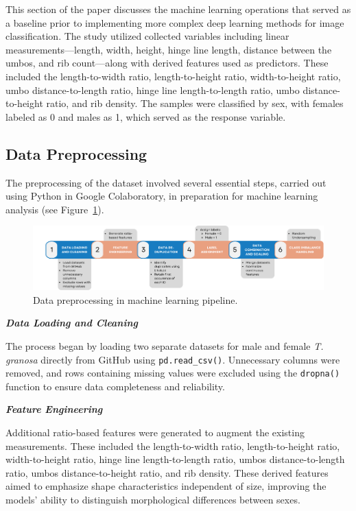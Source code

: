 This section of the paper discusses the machine learning operations that served as a baseline prior to implementing more complex deep learning methods for image classification. The study utilized collected variables including linear measurements—length, width, height, hinge line length, distance between the umbos, and rib count—along with derived features used as predictors. These included the length-to-width ratio, length-to-height ratio, width-to-height ratio, umbo distance-to-length ratio, hinge line length-to-length ratio, umbo distance-to-height ratio, and rib density. The samples were classified by sex, with females labeled as 0 and males as 1, which served as the response variable.

\subsection{Data Preprocessing}
\label{sec:pre-processing}

The preprocessing of the dataset involved several essential steps, carried out using Python in Google Colaboratory, in preparation for machine learning analysis (see Figure~\ref{fig:pipeline}).

\begin{figure}[!htbp]
	\centering
	\includegraphics[width=1\textwidth]{figures/pipeline.png}
	\caption{Data preprocessing in machine learning pipeline.}
	\label{fig:pipeline}
\end{figure}

\textbf{\textit{Data Loading and Cleaning}}

The process began by loading two separate datasets for male and female \textit{T. granosa} directly from GitHub using \texttt{pd.read\_csv()}. Unnecessary columns were removed, and rows containing missing values were excluded using the \texttt{dropna()} function to ensure data completeness and reliability.

\textbf{\textit{Feature Engineering}}

Additional ratio-based features were generated to augment the existing measurements. These included the length-to-width ratio, length-to-height ratio, width-to-height ratio, hinge line length-to-length ratio, umbos distance-to-length ratio, umbos distance-to-height ratio, and rib density. These derived features aimed to emphasize shape characteristics independent of size, improving the models' ability to distinguish morphological differences between sexes.

